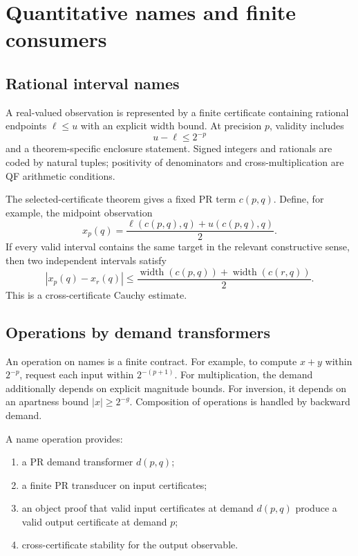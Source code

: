 \section{Quantitative names and finite consumers}

\subsection{Rational interval names}

A real-valued observation is represented by a finite certificate containing
rational endpoints \(\ell\le u\) with an explicit width bound.  At precision
\(p\), validity includes
\[
  u-\ell\le 2^{-p}
\]
and a theorem-specific enclosure statement.  Signed integers and rationals are
coded by natural tuples; positivity of denominators and cross-multiplication
are QF arithmetic conditions.

The selected-certificate theorem gives a fixed PR term
\(c(p,q)\).  Define, for example, the midpoint observation
\[
  x_p(q)=\frac{\ell(c(p,q),q)+u(c(p,q),q)}2.
\]
If every valid interval contains the same target in the relevant constructive
sense, then two independent intervals satisfy
\[
  |x_p(q)-x_r(q)|
  \le \frac{\operatorname{width}(c(p,q))+
                 \operatorname{width}(c(r,q))}{2}.
\]
This is a cross-certificate Cauchy estimate.

\subsection{Operations by demand transformers}

An operation on names is a finite contract.  For example, to compute
\(x+y\) within \(2^{-p}\), request each input within \(2^{-(p+1)}\).  For
multiplication, the demand additionally depends on explicit magnitude bounds.
For inversion, it depends on an apartness bound
\(|x|\ge2^{-g}\).  Composition of operations is handled by backward demand.

\begin{interface}
A name operation provides:
\begin{enumerate}
\item a PR demand transformer \(d(p,q)\);
\item a finite PR transducer on input certificates;
\item an object proof that valid input certificates at demand \(d(p,q)\)
produce a valid output certificate at demand \(p\);
\item cross-certificate stability for the output observable.
\end{enumerate}
\end{interface}

